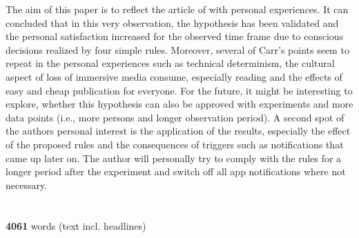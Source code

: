 \documentclass[11pt,a4paper]{article}
\begin{document}
The aim of this paper is to reflect the article of \citep{Carr.2008} with personal experiences. It can concluded that in this very observation, the hypothesis has been validated and the personal satisfaction increased for the observed time frame due to conscious decisions realized by four simple rules. Moreover, several of Carr's points seem to repeat in the personal experiences such as technical determinism, the cultural aspect of loss of immersive media consume, especially reading and the effects of easy and cheap publication for everyone. For the future, it might be interesting to explore, whether this hypothesis can also be approved with experiments and more data points (i.e., more persons and longer observation period). A second spot of the authors personal interest is the application of the results, especially the effect of the proposed rules and the consequences of triggers such as notifications that came up later on. The author will personally try to comply with the rules for a longer period after the experiment and switch off all app notifications where not necessary.\\

\ \\
\ \\
\textbf{4061} words (text incl. headlines)

\newpage





\printbibliography 
\end{document}

